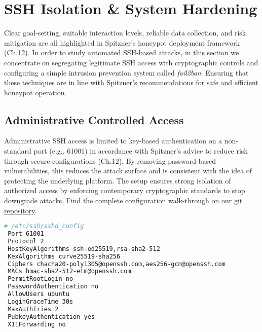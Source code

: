 \documentclass{cls/ULBreport}
\begin{document}


        
    \section{SSH Isolation \& System Hardening}
    Clear goal-setting, suitable interaction levels, reliable data collection, and risk mitigation are all highlighted in Spitzner's honeypot deployment framework (Ch.12). In order to study automated SSH-based attacks, in this section we concentrate on segregating legitimate SSH access with cryptographic controls and configuring a simple intrusion prevention system called \textit{fail2ban}. Ensuring that these techniques are in line with Spitzner's recommendations for safe and efficient honeypot operation.
        
        \subsection{Administrative Controlled Access}
    Administrative SSH access is limited to key-based authentication on a non-standard port (e.g., 61001) in accordance with Spitzner's advice to reduce risk through secure configurations (Ch.12). By removing password-based vulnerabilities, this reduces the attack surface and is consistent with the idea of protecting the underlying platform. The setup ensures strong isolation of authorized access by enforcing contemporary cryptographic standards to stop downgrade attacks. Find the complete configuration walk-through on \href{https://github.com/nottoBD/netsec-cowrie-honey}{our git repository}.        
        \begin{lstlisting}[language=bash,caption={Securing Legitimate Access}]
 # /etc/ssh/sshd_config
 Port 61001
 Protocol 2
 HostKeyAlgorithms ssh-ed25519,rsa-sha2-512
 KexAlgorithms curve25519-sha256
 Ciphers chacha20-poly1305@openssh.com,aes256-gcm@openssh.com
 MACs hmac-sha2-512-etm@openssh.com
 PermitRootLogin no
 PasswordAuthentication no
 AllowUsers ubuntu
 LoginGraceTime 30s
 MaxAuthTries 2
 PubkeyAuthentication yes
 X11Forwarding no\end{lstlisting}
        
        
\end{document}
